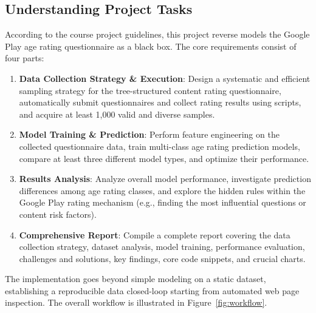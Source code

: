 \documentclass[11pt,a4paper]{article}
\begin{document}
\subsection{Understanding Project Tasks}

According to the course project guidelines, this project reverse models the Google Play age rating questionnaire as a black box. The core requirements consist of four parts:
\begin{enumerate}[leftmargin=2em]
  \item \textbf{Data Collection Strategy \& Execution}: Design a systematic and efficient sampling strategy for the tree-structured content rating questionnaire, automatically submit questionnaires and collect rating results using scripts, and acquire at least 1,000 valid and diverse samples.
  \item \textbf{Model Training \& Prediction}: Perform feature engineering on the collected questionnaire data, train multi-class age rating prediction models, compare at least three different model types, and optimize their performance.
  \item \textbf{Results Analysis}: Analyze overall model performance, investigate prediction differences among age rating classes, and explore the hidden rules within the Google Play rating mechanism (e.g., finding the most influential questions or content risk factors).
  \item \textbf{Comprehensive Report}: Compile a complete report covering the data collection strategy, dataset analysis, model training, performance evaluation, challenges and solutions, key findings, core code snippets, and crucial charts.
\end{enumerate}

The implementation goes beyond simple modeling on a static dataset, establishing a reproducible data closed-loop starting from automated web page inspection. The overall workflow is illustrated in Figure~\ref{fig:workflow}.
\end{document}
